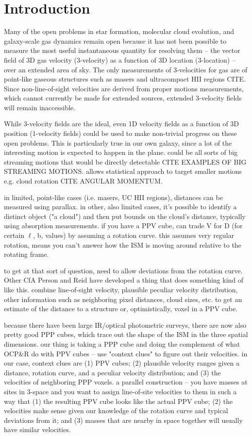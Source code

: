 \section{Introduction}
Many of the open problems in star formation, molecular cloud evolution, and galaxy-scale gas dynamics remain open because it has not been possible to measure the most useful instantaneous quantity for resolving them -- the vector field of 3D gas velocity (3-velocity) as a function of 3D location (3-location) -- over an extended area of sky.
The only measurements of 3-velocities for gas are of point-like gaseous structures such as masers and ultracompact HII regions CITE.
Since non-line-of-sight velocities are derived from proper motions measurements, which cannot currently be made for extended sources, extended 3-velocity fields will remain inaccessible.

While 3-velocity fields are the ideal, even 1D velocity fields as a function of 3D position (1-velocity fields) could be used to make non-trivial progress on these open problems.
This is particularly true in our own galaxy, since a lot of the interesting motion is expected to happen in the plane.
could be all sorts of big streaming motions that would be directly detectable CITE EXAMPLES OF BIG STREAMING MOTIONS.
allows statistical approach to target smaller motions e.g. cloud rotation CITE ANGULAR MOMENTUM.

in limited, point-like cases (i.e. masers, UC HII regions), distances can be measured using parallax.
in other, also limited cases, it's possible to identify a distinct object ("a cloud") and then put bounds on the cloud's distance, typically using absorption measurements. 
if you have a PPV cube, can trade V for D (for certain $\ell$, b, values) by assuming a rotation curve. 
this assumes very regular rotation, means you can't answer how the ISM is moving around relative to the rotating frame.

to get at that sort of question, need to allow deviations from the rotation curve.
Other CfA Person and Reid have developed a thing that does something kind of like this. 
combine line-of-sight velocity, plausible peculiar velocity distribution, other information such as neighboring pixel distances, cloud sizes, etc. to get an estimate of the distance to a structure or, optimistically, voxel in a PPV cube.

because there have been large IR/optical photometric surveys, there are now also pretty good PPP cubes, which trace out the shape of the ISM in the three spatial dimensions. 
our thing is taking a PPP cube and doing the complement of what OCP\&R do with PPV cubes -- use "context clues" to figure out their velocities.
in our case, context clues are (1) PPV cubes; (2) plausible velocity ranges given a distance, rotation curve, and a peculiar velocity distribution; and (3) the velocities of neighboring PPP voxels. 
a parallel construction -- you have masses at sites in 3-space and you want to assign line-of-site velocities to them in such a way that (1) the resulting PPV cube looks like the actual PPV cube; (2) the velocities make sense given our knowledge of the rotation curve and typical deviations from it; and (3) masses that are nearby in space together will usually have similar velocities.

